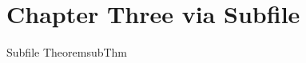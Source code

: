 \documentclass[../main.tex]{subfiles}
\begin{document}
\section{Chapter Three via Subfile}
\label{sec:ch3}

\begin{thm}{Subfile Theorem}{subThm}
\end{thm}
\end{document}
